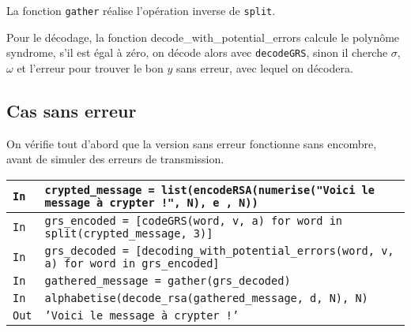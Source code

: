 \documentclass[titlepage]{article}
\begin{document}
    La fonction \texttt{gather} réalise l'opération inverse de \texttt{split}.

    

    Pour le décodage, la fonction decode\_with\_potential\_errors calcule le polynôme syndrome,
    s'il est égal à zéro, on décode alors avec \texttt{decodeGRS}, sinon il cherche $\sigma$, $\omega$ et l'erreur
    pour trouver le bon $y$ sans erreur, avec lequel on décodera.

    

        \subsection{Cas sans erreur}

        On vérifie tout d'abord que la version sans erreur fonctionne sans encombre, avant de simuler des erreurs de transmission.
        \bigbreak

        \begin{tabularx}{12cm}{|p{0.60cm}|X|}
            \hline
            \rowcolor{gray}
            \texttt{In}
            & 
            \texttt{crypted\_message = list(encodeRSA(numerise("Voici le message à crypter !", N), e , N))}
            \\
            \hline
            \rowcolor{gray}
            \texttt{In}
            &
            \texttt{grs\_encoded = [codeGRS(word, v, a) for word in split(crypted\_message, 3)]}
            \\
            \hline
            \rowcolor{gray}
            \texttt{In}
            &
            \texttt{grs\_decoded = [decoding\_with\_potential\_errors(word, v, a) for word in grs\_encoded]}
            \\
            \hline
            \rowcolor{gray}
            \texttt{In}
            &
            \texttt{gathered\_message = gather(grs\_decoded)}
            \\
            \hline
            \rowcolor{gray}
            \texttt{In}
            &
            \texttt{alphabetise(decode\_rsa(gathered\_message, d, N), N)}
            \\
            \hline
            \texttt{Out}
            &
            \texttt{'Voici le message à crypter !'}
            \\
            \hline
        \end{tabularx}
        \bigbreak
    
\end{document}
